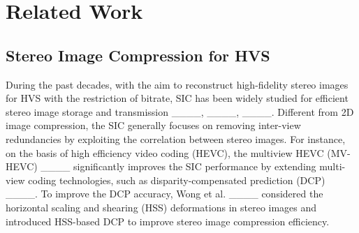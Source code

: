 \section{Related Work}
\label{section2}




\subsection{Stereo Image Compression for HVS} 

During the past decades, with the aim to reconstruct high-fidelity stereo images for HVS with the restriction of bitrate, \textcolor[rgb]{0,0,0}{SIC has been widely studied for efficient stereo image storage and transmission ____, ____, ____.}
Different from 2D image compression, the SIC generally focuses on removing inter-view redundancies by exploiting the correlation between stereo images. For instance, on the basis of high efficiency video coding (HEVC), the multiview HEVC (MV-HEVC) ____ significantly improves the SIC performance by extending multi-view coding technologies, such as disparity-compensated prediction (DCP) ____. To improve the DCP accuracy,  Wong et al.  ____ considered the horizontal scaling and shearing (HSS) deformations in stereo images and introduced HSS-based DCP to improve stereo image compression efficiency. 	

